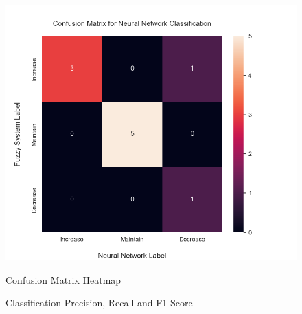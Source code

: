 \documentclass[titlepage]{article}
\newcommand*\apos{\textsc{\char13}}
\begin{document}
\begin{figure}[H]
    \centering
    \begin{minipage}{0.55\textwidth}
    \includegraphics[width=\textwidth]{../images/final_results/conf_matrix}
    \caption{Confusion Matrix Heatmap}
    \label{fig:conf_matrix_final}
    \end{minipage}
    \hfill
    \begin{minipage}{0.4\textwidth}
        \begin{table}[H]
            \centering
            
            \caption{Classification Precision, Recall and F1-Score}
            \label{tab:scores_final}
        \end{table}
    \end{minipage}
\end{figure}

\end{document}

